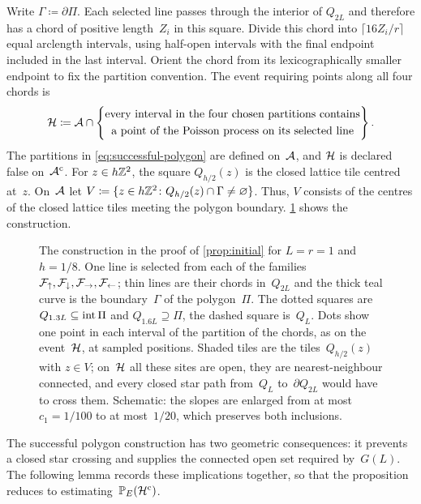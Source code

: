 \documentclass[11pt,letterpaper]{article}
\begin{document}
Write $\Gamma\coloneqq\partial \Pi$. Each selected line passes through the interior of $Q_{2L}$ and therefore has a chord of positive length~$Z_i$ in this square. Divide this chord into $\lceil16Z_i/r\rceil$ equal arclength intervals, using half-open intervals with the final endpoint included in the last interval. Orient the chord from its lexicographically smaller endpoint to fix the partition convention. The event requiring points along all four chords is
\begin{equation}\label{eq:successful-polygon}
  \mathcal H\coloneqq\mathcal A\cap\Bigg\{
    \begin{gathered}
      \text{every interval in the four chosen partitions contains}\\
      \text{a point of the Poisson process on its selected line}
    \end{gathered}
  \Bigg\}\,.
\end{equation}
The partitions in \eqref{eq:successful-polygon} are defined on~$\mathcal A$, and $\mathcal H$ is declared false on~$\mathcal A^{\mathrm{c}}$. For $z\in h\mathbb Z^2$, the square $Q_{h/2}(z)$ is the closed lattice tile centred at~$z$. On~$\mathcal A$ let $V\coloneqq\{z\in h\mathbb Z^2\colon Q_{h/2}(z)\cap\Gamma\neq\varnothing\}$. Thus, $V$ consists of the centres of the closed lattice tiles meeting the polygon boundary. \cref{fig:polygon} shows the construction.

\begin{figure}[ht]
  \centering
  
  \caption{The construction in the proof of \cref{prop:initial} for $L=r=1$ and $h=1/8$. One line is selected from each of the families $\mathcal F_{\uparrow},\mathcal F_{\downarrow},\mathcal F_{\rightarrow},\mathcal F_{\leftarrow}$; thin lines are their chords in~$Q_{2L}$ and the thick teal curve is the boundary~$\Gamma$ of the polygon~$\Pi$. The dotted squares are $Q_{1.3L}\subseteq\operatorname{int} \Pi$ and $Q_{1.6L}\supseteq \Pi$, the dashed square is~$Q_L$. Dots show one point in each interval of the partition of the chords, as on the event~$\mathcal H$, at sampled positions. Shaded tiles are the tiles~$Q_{h/2}(z)$ with $z\in V$; on~$\mathcal H$ all these sites are open, they are nearest-neighbour connected, and every closed star path from~$Q_L$ to~$\partial Q_{2L}$ would have to cross them. Schematic: the slopes are enlarged from at most $c_1=1/100$ to at most~$1/20$, which preserves both inclusions.}
  \label{fig:polygon}
\end{figure}

The successful polygon construction has two geometric consequences: it prevents a closed star crossing and supplies the connected open set required by~$G(L)$. The following lemma records these implications together, so that the proposition reduces to estimating~$\mathbb P_E(\mathcal H^{\mathrm{c}})$.
\end{document}
